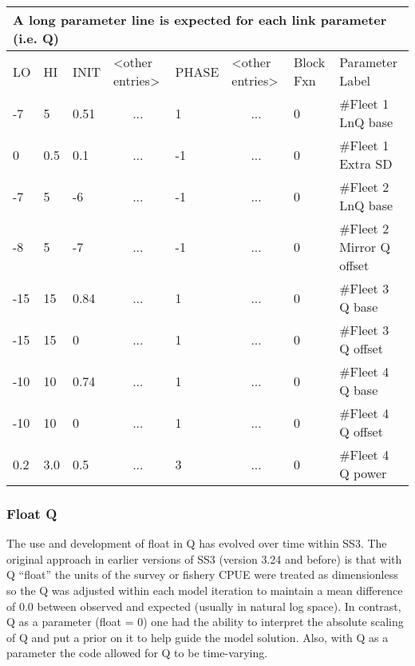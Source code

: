 \begin{longtable}{p{1cm} p{1cm} p{1cm} p{1.5cm} p{1.5cm} p{1.5cm} p{1.75cm} p{4cm}}
	\multicolumn{8}{l}{A long parameter line is expected for each link parameter (i.e. Q)} \\
	\hline
	LO \Tstrut & HI & INIT & <other entries> & PHASE & <other entries> & Block Fxn & Parameter Label \Bstrut\\
	\hline
	-7  & 5   & 0.51 & \multicolumn{1}{c}{...} &  1 & \multicolumn{1}{c}{...} & 0 & \#Fleet 1 LnQ base \Tstrut\\
	 0  & 0.5 & 0.1  & \multicolumn{1}{c}{...} & -1 & \multicolumn{1}{c}{...} & 0 & \#Fleet 1 Extra SD \\
	-7  & 5   & -6   & \multicolumn{1}{c}{...} & -1 & \multicolumn{1}{c}{...} & 0 & \#Fleet 2 LnQ base \\
	-8  & 5   & -7   & \multicolumn{1}{c}{...} & -1 & \multicolumn{1}{c}{...} & 0 & \#Fleet 2 Mirror Q offset \\
	-15 & 15  & 0.84 & \multicolumn{1}{c}{...} &  1 & \multicolumn{1}{c}{...} & 0 & \#Fleet 3 Q base \\
    -15 & 15  & 0    & \multicolumn{1}{c}{...} &  1 & \multicolumn{1}{c}{...} & 0 & \#Fleet 3 Q offset \\
	-10 & 10  & 0.74 & \multicolumn{1}{c}{...} &  1 & \multicolumn{1}{c}{...} & 0 & \#Fleet 4 Q base \\
    -10 & 10  & 0    & \multicolumn{1}{c}{...} &  1 & \multicolumn{1}{c}{...} & 0 & \#Fleet 4 Q offset \\
    0.2 & 3.0 & 0.5  & \multicolumn{1}{c}{...} &  3 & \multicolumn{1}{c}{...} & 0 & \#Fleet 4 Q power \Bstrut\\
	\hline
\end{longtable}

\hypertarget{FloatQ}{}
\subsubsection{Float Q}
The use and development of float in Q has evolved over time within SS3. The original approach in earlier versions of SS3 (version 3.24 and before) is that with Q ``float'' the units of the survey or fishery CPUE were treated as dimensionless so the Q was adjusted within each model iteration to maintain a mean difference of 0.0 between observed and expected (usually in natural log space). In contrast, Q as a parameter (float = 0) one had the ability to interpret the absolute scaling of Q and put a prior on it to help guide the model solution. Also, with Q as a parameter the code allowed for Q to be time-varying.

